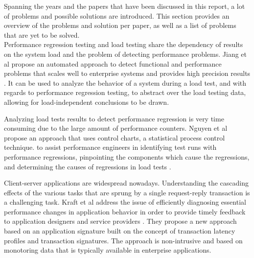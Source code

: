 Spanning the years and the papers that have been discussed in this report, a lot of problems and possible solutions are introduced. This section provides an overview of the problems and solution per paper, as well as a list of problems that are yet to be solved.\\

Performance regression testing and load testing share the dependency of results on the system load and the problem of detecting performance problems. Jiang et al propose an automated approach to detect functional and performance problems that scales well to enterprise systems and provides high precision results \cite{jiang2010automated}. It can be used to analyze the behavior of a system during a load test, and with regards to performance regression testing, to abstract over the load testing data, allowing for load-independent conclusions to be drawn.

Analyzing load tests results to detect performance regression is
very time consuming due to the large amount of performance
counters. Nguyen et al propose an approach that uses control charts, a statistical process control technique. to assist performance engineers in identifying test runs with performance regressions, pinpointing the components which cause the regressions, and determining the causes of regressions in load tests \cite{nguyen2012using}.

Client-server applications are widespread nowadays. Understanding the cascading effects of the various tasks that are sprung by a single request-reply transaction is a challenging task. Kraft et al address the issue of efficiently diagnosing essential performance changes in application behavior in order to provide timely feedback to  application designers and service providers \cite{kraft2009estimating}. They propose a new approach based on an application signature built on the concept of transaction latency profiles and transaction signatures. The approach is non-intrusive and based on monotoring data that is typically available in enterprise applications.
